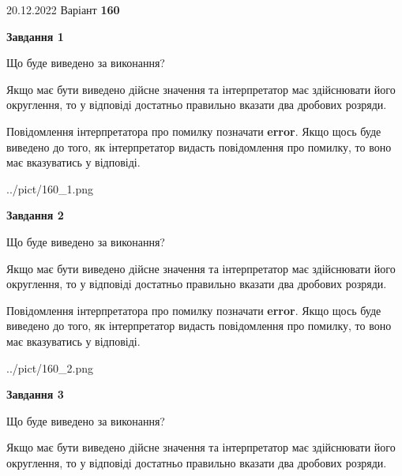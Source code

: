 \documentclass[12pt, ukrainian]{article}
\begin{document}
{20.12.2022 Варіант \No \textbf { 160 }\par}
{
\begin {Large}

{\begin {center}\textbf{Завдання 1}\end {center}}\par
Що буде виведено за виконання? \par

Якщо має бути виведено дійсне значення та інтерпретатор має здійснювати його округлення, 
то у відповіді достатньо правильно вказати два дробових розряди.

Повідомлення інтерпретатора про помилку позначати \textbf{error}.
Якщо щось буде виведено до того, як інтерпретатор видасть повідомлення про помилку, 
то воно має вказуватись у відповіді. \par

\begin{center}
	{../pict/160_1.png}
\end{center}
\newpage

{\begin {center}\textbf{Завдання 2}\end {center}}\par
Що буде виведено за виконання? \par

Якщо має бути виведено дійсне значення та інтерпретатор має здійснювати його округлення, 
то у відповіді достатньо правильно вказати два дробових розряди.

Повідомлення інтерпретатора про помилку позначати \textbf{error}.
Якщо щось буде виведено до того, як інтерпретатор видасть повідомлення про помилку, 
то воно має вказуватись у відповіді. \par

\begin{center}
	{../pict/160_2.png}
\end{center}
\newpage

{\begin {center}\textbf{Завдання 3}\end {center}}\par
Що буде виведено за виконання? \par

Якщо має бути виведено дійсне значення та інтерпретатор має здійснювати його округлення, 
то у відповіді достатньо правильно вказати два дробових розряди.


\end{Large}}
\end{document}
